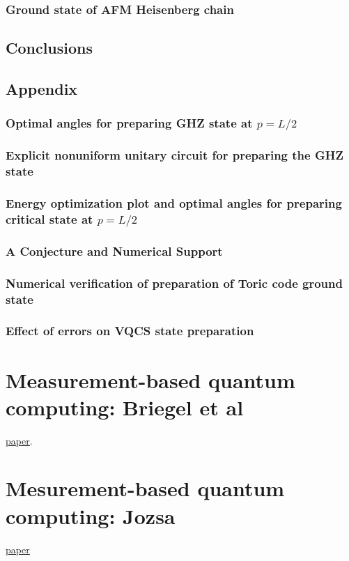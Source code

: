 \documentclass{book}
\theoremstyle{definition}
\begin{document}
\subsubsection{Ground state of AFM Heisenberg chain}











\subsection{Conclusions}


\subsection{Appendix}

\subsubsection{Optimal angles for preparing GHZ state at $p=L/2$}
\subsubsection{Explicit nonuniform unitary circuit for preparing the GHZ state}
\subsubsection{Energy optimization plot and optimal angles for preparing critical state at $p=L/2$}
\subsubsection{A Conjecture and Numerical Support}
\subsubsection{Numerical verification of preparation of Toric code ground state}
\subsubsection{Effect of errors on VQCS state preparation}






\newpage



\section{Measurement-based quantum computing: Briegel et al}

\href{https://www.nature.com/articles/nphys1157.pdf}{\underline{paper}}.


\newpage


\section{Mesurement-based quantum computing: Jozsa}




\href{https://arxiv.org/pdf/quant-ph/0508124.pdf}{\underline{paper}}
\end{document}
